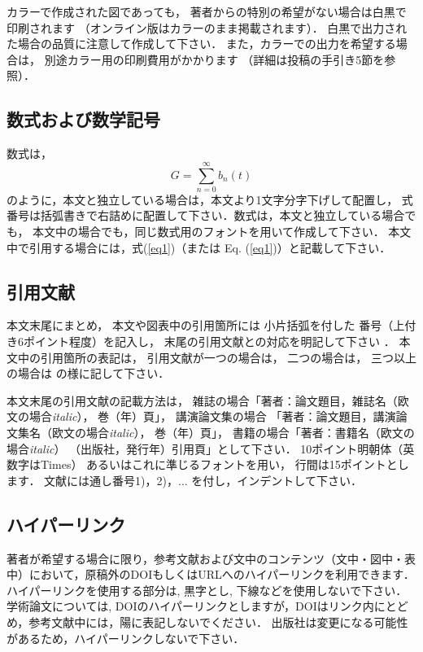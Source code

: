 \documentclass[原著論文]{nagare}
\begin{document}
カラーで作成された図であっても，
著者からの特別の希望がない場合は白黒で印刷されます
（オンライン版はカラーのまま掲載されます）．
白黒で出力された場合の品質に注意して作成して下さい．
また，カラーでの出力を希望する場合は，
別途カラー用の印刷費用がかかります
（詳細は投稿の手引き5節を参照）．

\subsection{数式および数学記号}

数式は，
\begin{equation}
G=\sum^{\infty}_{n=0} b_n(t)
\label{eq1}
\end{equation}
のように，本文と独立している場合は，本文より1文字分字下げして配置し，
式番号は括弧書きで右詰めに配置して下さい．数式は，本文と独立している場合でも，
本文中の場合でも，同じ数式用のフォントを用いて作成して下さい．
本文中で引用する場合には，式(\ref{eq1})（または Eq. (\ref{eq1})）と記載して下さい．

\subsection{引用文献}

本文末尾\cite{Cantwell}にまとめ，
本文や図表中の引用箇所には
小片括弧\cite{Pearson+Bitter,Temam}を付した
番号（上付き6ポイント程度）を記入し，
末尾の引用文献との対応を明記して下さい%
\cite{artjp,procjp,bookjp}．
本文中の引用箇所の表記は，
引用文献が一つの場合は，
二つの場合は，
三つ以上の場合は
の様に記して下さい．

本文末尾の引用文献の記載方法は，
雑誌の場合「著者：論文題目，雑誌名（欧文の場合\textit{italic}），
巻（年）頁」\cite{Cantwell,artjp}，
講演論文集の場合
「著者：論文題目，講演論文集名（欧文の場合\textit{italic}），
巻（年）頁」\cite{Pearson+Bitter,procjp}，
書籍の場合「著者：書籍名（欧文の場合\textit{italic}）
（出版社，発行年）引用頁」\cite{Temam,bookjp}として下さい．
10ポイント明朝体（英数字はTimes）
あるいはこれに準じるフォントを用い，
行間は15ポイントとします．
文献には通し番号1)，2)，... を付し，インデントして下さい．


\subsection{ハイパーリンク}

著者が希望する場合に限り，参考文献および文中のコンテンツ（文中・図中・表中）において，原稿外のDOIもしくはURLへのハイパーリンクを利用できます．
ハイパーリンクを使用する部分は, 黒字とし, 下線などを使用しないで下さい．
学術論文については, DOIのハイパーリンクとしますが，DOIはリンク内にとどめ，参考文献中には，陽に表記しないでください．
出版社は変更になる可能性があるため，ハイパーリンクしないで下さい．
\end{document}
